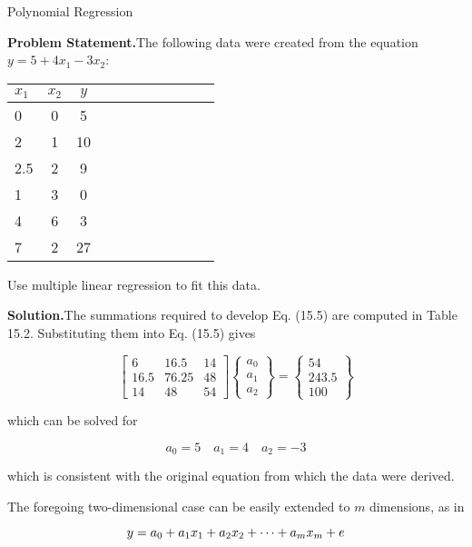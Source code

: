 \documentclass[../main.tex]{subfiles}
\begin{document}

\begin{example} Polynomial Regression

    \textbf{Problem Statement.}\quad The following data were created from the equation $y = 5 + 4x_1 - 3x_2$:

	\begin{tabular}{l c c c c c c c c c c}
		$x_1$ & $x_2$ & $y$ \\
		\hline
		0 & 0 & 5 \\
		2 & 1 & 10 \\
		2.5 & 2 & 9 \\
		1 & 3 & 0 \\
		4 & 6 & 3 \\
		7 & 2 & 27
  	\end{tabular}

	\noindent Use multiple linear regression to fit this data.

	\noindent\textbf{Solution.}\quad The summations required to develop Eq. (15.5) are computed in Table 15.2. Substituting them into Eq. (15.5) gives

	\begin{equation}
		\tag{15.6}
		\begin{bmatrix}
			6 & 16.5 & 14 \\
			16.5 & 76.25 & 48 \\
			14 & 48 & 54
		\end{bmatrix}
		\begin{Bmatrix}
			a_0 \\ a_1 \\ a_2
		\end{Bmatrix}
		=
		\begin{Bmatrix}
			54 \\ 243.5 \\ 100
		\end{Bmatrix}
	\end{equation}

	\noindent which can be solved for

	$$a_0 = 5 \quad a_1 = 4 \quad a_2 = -3$$

	\noindent which is consistent with the original equation from which the data were derived.
\end{example}

The foregoing two-dimensional case can be easily extended to $m$ dimensions, as in

\begin{equation}
	\notag
	y = a_0 + a_1 x_1 + a_2 x_2 + \cdots + a_m x_m + e
\end{equation}
\end{document}
